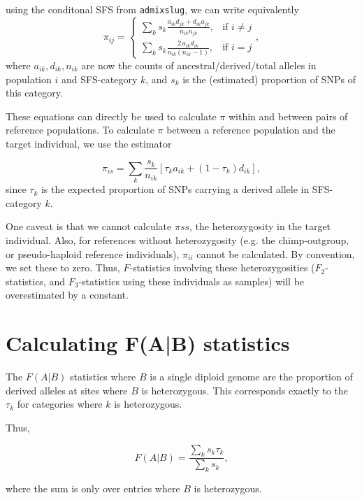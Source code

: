 \documentclass[10pt,a4paper]{article}
\begin{document}
using the conditonal SFS from \texttt{admixslug}, we can write equivalently
\begin{equation}
\pi_{ij} = \begin{cases}
\sum_k s_k \frac{a_{ik}d_{jk} + d_{ik}a_{jk}} {n_{ik}n_{jk}} ,& \text{if } i \neq j\\
\sum_k s_k \frac{2\, a_{ik}d_{ik}}{n_{ik}(n_{ik} -1)},              & \text{if }i =j
\end{cases},
\end{equation}
where $a_{ik}, d_{ik}, n_{ik}$ are now the counts of ancestral/derived/total alleles in population $i$ and SFS-category $k$, and $s_k$ is the (estimated) proportion of SNPs of this category.

These equations can directly be used to calculate $\pi$ within and between pairs of reference populations. To calculate $\pi$ between a reference population and the target individual, we use the estimator

\begin{equation}
\pi_{is} = \sum_k \frac{s_k}{n_{ik}} \left[\tau_k a_{ik}+ (1-\tau_k) d_{ik}\right],
\end{equation}
since $\tau_k$ is the expected proportion of SNPs carrying a derived allele in SFS-category $k$.


One caveat is that we cannot calculate $\pi{ss}$, the heterozygosity in the target individual. Also, for references without heterozygosity (e.g. the chimp-outgroup, or pseudo-haploid reference individuals), $\pi_{ii}$ cannot be calculated. By convention, we set these to zero. Thus, $F$-statistics involving these heterozygosities ($F_2$-statistics, and $F_3$-statistics using these individuals as samples) will be overestimated by a constant.


\section{Calculating F(A|B) statistics}
The $F(A|B)$ statistics where $B$ is a single diploid genome are the proportion of derived alleles at sites where $B$ is heterozygous. This corresponds exactly to the $\tau_k$ for categories where $k$ is heterozygous.

Thus,

\begin{equation}
	F(A|B) = \frac{\sum_k s_k \tau_k}{\sum_k s_k},
\end{equation}

where the sum is only over entries where $B$ is heterozygous.



\end{document}
